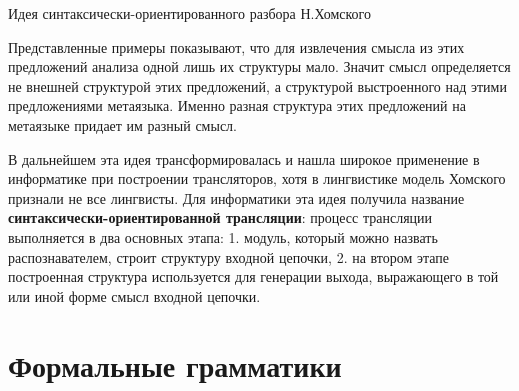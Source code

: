 \documentclass[12pt, pdf, hyperref={unicode},handout]{beamer}
\begin{document}
\begin{frame}{Идея синтаксически-ориентированного разбора Н.Хомского}
  \begin{block}

    \small{
      Представленные примеры показывают, что для извлечения смысла из этих предложений анализа одной лишь их структуры мало. Значит смысл определяется не внешней структурой этих предложений, а структурой выстроенного над этими предложениями метаязыка. Именно разная структура этих предложений на метаязыке придает им разный смысл.

      В дальнейшем эта идея трансформировалась и нашла широкое применение в информатике при построении трансляторов, хотя в лингвистике модель Хомского признали не все лингвисты. Для информатики эта идея получила название \textbf{синтаксически-ориентированной трансляции}: процесс трансляции выполняется в два основных этапа: 1. модуль, который можно назвать распознавателем, строит структуру входной цепочки, 2. на втором этапе построенная структура используется для генерации выхода, выражающего в той или иной форме смысл входной цепочки.
      }

  \end{block}
  
\end{frame}
\section{Формальные грамматики}
\end{document}
